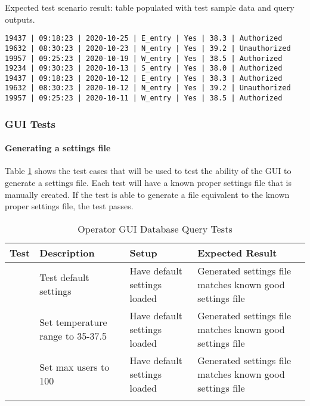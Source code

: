 \noindent
Expected test scenario result: table populated with test sample data and query
outputs.

\begin{listing}[H]
\begin{verbatim}
19437 | 09:18:23 | 2020-10-25 | E_entry | Yes | 38.3 | Authorized
19632 | 08:30:23 | 2020-10-23 | N_entry | Yes | 39.2 | Unauthorized
19957 | 09:25:23 | 2020-10-19 | W_entry | Yes | 38.5 | Authorized
19234 | 09:30:23 | 2020-10-13 | S_entry | Yes | 38.0 | Authorized
19437 | 09:18:23 | 2020-10-12 | E_entry | Yes | 38.3 | Authorized
19632 | 08:30:23 | 2020-10-12 | N_entry | Yes | 39.2 | Unauthorized
19957 | 09:25:23 | 2020-10-11 | W_entry | Yes | 38.5 | Authorized
\end{verbatim}
\end{listing}

\subsubsection{GUI Tests}

\paragraph{Generating a settings file}

Table \ref{table:op-gui-settings-tests} shows the test cases that will be used to test the
ability of the GUI to generate a settings file.  Each test will have a known
proper settings file that is manually created.  If the test is able to generate
a file equivalent to the known proper settings file, the test passes.

\begin{longtable}[htb]{>{\centering\arraybackslash}m{0.75cm}|>{\centering\arraybackslash}m{4cm}|>{\centering\arraybackslash}m{4.5cm}|>{\centering\arraybackslash}m{4cm}}
\toprule
Test & Description & Setup & Expected Result \\
\midrule
1 & Test default settings & Have default settings loaded & Generated
settings file matches known good settings file \\
\hline
2 & Set temperature range to 35-37.5 & Have default settings loaded & Generated
settings file matches known good settings file \\
\hline
3 & Set max users to 100 & Have default settings loaded & Generated
settings file matches known good settings file \\
\bottomrule
\caption{Operator GUI Database Query Tests}
\label{table:op-gui-settings-tests}
\end{longtable}


